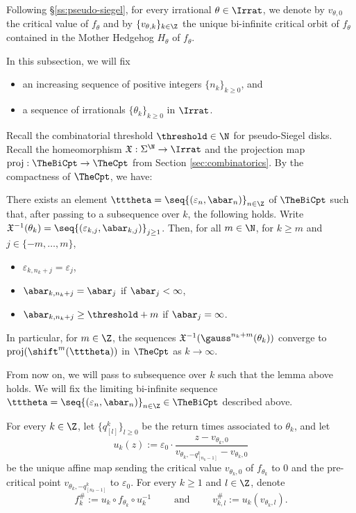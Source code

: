 \documentclass{amsart}
\begin{document}
Following \S\ref{ss:pseudo-siegel}, for every irrational $\theta \in \Irrat$, we denote by $v_{\theta,0}$ the critical value of $f_{\theta}$ and by $\{v_{\theta,k}\}_{k \in \Z}$ the unique bi-infinite critical orbit of $f_{\theta}$ contained in the Mother Hedgehog $H_{\theta}$ of $f_{\theta}$.

In this subsection, we will fix
\begin{itemize}
    \item an increasing sequence of positive integers $\{n_k\}_{ k\geq 0}$, and 
    \item a sequence of irrationals $\{\theta_k\}_{k \geq 0}$ in $\Irrat$.
\end{itemize}

Recall the combinatorial threshold $\threshold \in \N$ for pseudo-Siegel disks.
Recall the homeomorphism $\mathfrak{X}: \Sigma^{\N} \to \Irrat$ and the projection map $\textnormal{proj}: \TheBiCpt \to \TheCpt$ from Section \ref{sec:combinatorics}.
By the compactness of $\TheCpt$, we have:

\begin{lemma}
    \label{lem:combinatorial-convergence}
    There exists an element $\tttheta = \seq{ (\varepsilon_n, \abar_n) }_{n \in \Z}$ of $\TheBiCpt$ such that, after passing to a subsequence over $k$, the following holds.
    Write $\mathfrak{X}^{-1}(\theta_k) = \seq{(\varepsilon_{k,j}, \abar_{k,j})}_{j \geq 1}$.
    Then, for all $m \in \N$, for $k \geq m$ and $j \in \{-m,\ldots, m\}$,
    \begin{itemize}
        \item $\varepsilon_{k,n_k+j} = \varepsilon_j$, 
        \item $\abar_{k,n_k+j} = \abar_j$ if $\abar_j < \infty$,
        \item $\abar_{k,n_k+j} \geq \threshold + m$ if $\abar_j = \infty$.
    \end{itemize}
    In particular, for $m \in \Z$, the sequences $\mathfrak{X}^{-1}(\gauss^{n_k+m}(\theta_k))$ converge to $\textnormal{proj}(\shift^m(\tttheta))$ in $\TheCpt$ as $k \to \infty$.
\end{lemma}

From now on, we will pass to subsequence over $k$ such that the lemma above holds.
We will fix the limiting bi-infinite sequence $\tttheta = \seq{ (\varepsilon_n, \abar_n) }_{n \in \Z} \in \TheBiCpt$ described above.

For every $k \in \Z$, let $\{q^k_{[l]}\}_{l\geq 0}$ be the return times associated to $\theta_k$, and let 
\[
    u_k(z) := \varepsilon_{0} \cdot\frac{z-v_{\theta_k,0}}{v_{\theta_k,-q^k_{[n_k-1]}}-v_{\theta_k,0}}
\]
be the unique affine map sending the critical value $v_{\theta_k,0}$ of $f_{\theta_k}$ to $0$ and the pre-critical point $v_{\theta_k, -q^k_{[n_k-1]}}$ to $\varepsilon_0$.
For every $k \geq 1$ and $l \in \Z$, denote
\begin{equation}
    \label{eqn:hash-notation}
        f_k^{\#} := u_k \circ f_{\theta_k} \circ u_k^{-1} \qquad
        \text{ and } \qquad
        v^{\#}_{k,l} := u_k(v_{\theta_k, l}).
\end{equation}
\end{document}
